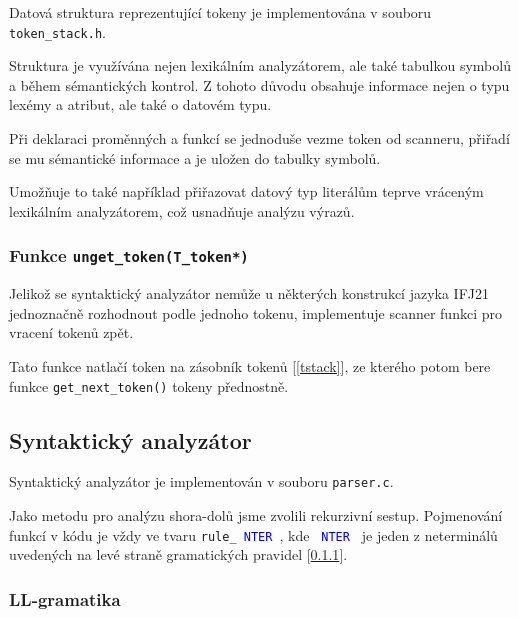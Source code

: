 \documentclass[a4paper]{article}
\theoremstyle{definition}
\newcommand{\nter}[1]{\textcolor{blue}{\,#1\,}}
\begin{document}
Datová struktura reprezentující tokeny je implementována v souboru \texttt{token\_stack.h}.

Struktura je využívána nejen lexikálním analyzátorem, ale také tabulkou symbolů a během sémantických kontrol. Z tohoto důvodu obsahuje informace nejen o typu lexémy a atribut, ale také o datovém typu.

Při deklaraci proměnných a funkcí se jednoduše vezme token od scanneru, přiřadí se mu sémantické informace a je uložen do tabulky symbolů.

Umožňuje to také například přiřazovat datový typ literálům teprve vráceným lexikálním analyzátorem, což usnadňuje analýzu výrazů.


\subsubsection{Funkce \texttt{unget\_token(T\_token*)}}\label{sec_unget_token}

Jelikož se syntaktický analyzátor nemůže u některých konstrukcí jazyka IFJ21 jednoznačně rozhodnout podle jednoho tokenu, implementuje scanner funkci pro vracení tokenů zpět.

Tato funkce natlačí token na zásobník tokenů [\ref{tstack}], ze kterého potom bere funkce \texttt{get\_next\_token()} tokeny přednostně.

\subsection{Syntaktický analyzátor}

Syntaktický analyzátor je implementován v souboru \texttt{parser.c}.

Jako metodu pro analýzu shora-dolů jsme zvolili rekurzivní sestup. Pojmenování funkcí v kódu je vždy ve tvaru \texttt{rule\_\nter{NTER}}, kde \texttt{\nter{NTER}} je jeden z neterminálů uvedených na levé straně gramatických pravidel [\ref{sec_grammar}].

\newpage

\subsubsection{LL-gramatika}\label{sec_grammar}
\end{document}
